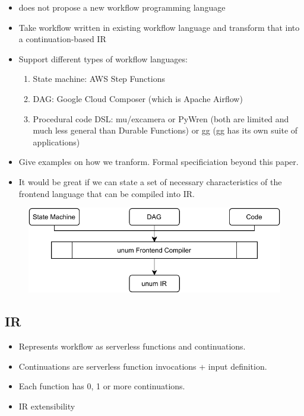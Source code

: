 \begin{itemize}
	\item \name{} does not propose a new workflow programming language
	\item Take workflow written in existing workflow language and transform
	that into a continuation-based IR
	\item Support different types of workflow languages:

		\begin{enumerate}
			\item State machine: AWS Step Functions
			\item DAG: Google Cloud Composer (which is Apache Airflow)
			\item Procedural code DSL: mu/excamera or PyWren (both are limited and
			much less general than Durable Functions) or gg (gg has its own suite
			of applications)
		\end{enumerate}

	\item Give examples on how we tranform. Formal specificiation beyond this paper.
	\item It would be great if we can state a set of necessary characteristics
	of the frontend language that can be compiled into \name{} IR.
\end{itemize}

\begin{figure}[t!]
    \centering
    \includegraphics[width=\columnwidth]{figures/unum-frontends.pdf}
\end{figure}

\subsection{\name{} IR}

\begin{itemize}
	\item Represents workflow as serverless functions and continuations.
	\item Continuations are serverless function invocations + input definition.
	\item Each function has 0, 1 or more continuations.
	\item IR extensibility
\end{itemize}
 


